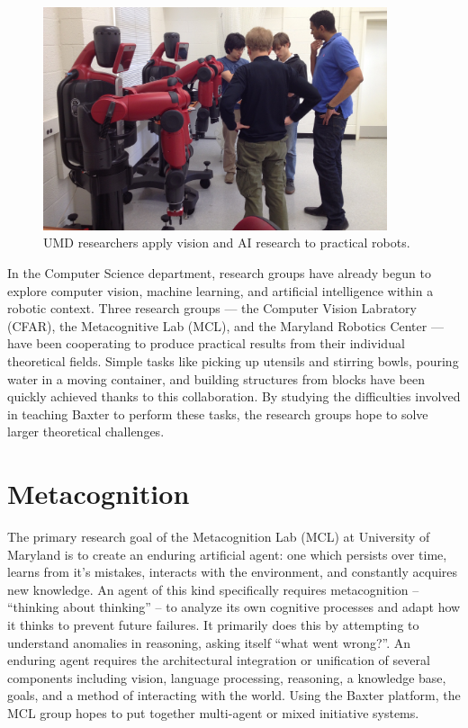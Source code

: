 \documentclass[DIV=calc, fontsize=12pt, twocolumn]{scrartcl}
\begin{document}
\begin{figure}
	\centering
    \includegraphics[width=0.90\textwidth]{IMG_1955.jpg}
    \caption{\textsf{UMD researchers apply vision and AI research to practical robots.}}
    \label{fig:robots}
\end{figure}

In the Computer Science department, research groups have already begun to explore computer vision, machine learning, and artificial intelligence within a robotic context. Three research groups — the Computer Vision Labratory (CFAR), the Metacognitive Lab (MCL), and the Maryland Robotics Center — have been cooperating to produce practical results from their individual theoretical fields. Simple tasks like picking up utensils and stirring bowls, pouring water in a moving container, and building structures from blocks have been quickly achieved thanks to this collaboration. By studying the difficulties involved in teaching Baxter to perform these tasks, the research groups hope to solve larger theoretical challenges.

\section*{Metacognition}

The primary research goal of the Metacognition Lab (MCL) at University of Maryland is to create an enduring artificial agent: one which persists over time, learns from it’s mistakes, interacts with the environment, and constantly acquires new knowledge. An agent of this kind specifically requires metacognition – “thinking about thinking” – to analyze its own cognitive processes and adapt how it thinks to prevent future failures. It primarily does this by attempting to understand anomalies in reasoning, asking itself “what went wrong?”. An enduring agent requires the architectural integration or unification of several components including vision, language processing, reasoning, a knowledge base, goals, and a method of interacting with the world. Using the Baxter platform, the MCL group hopes to put together multi-agent or mixed initiative systems.
\end{document}
